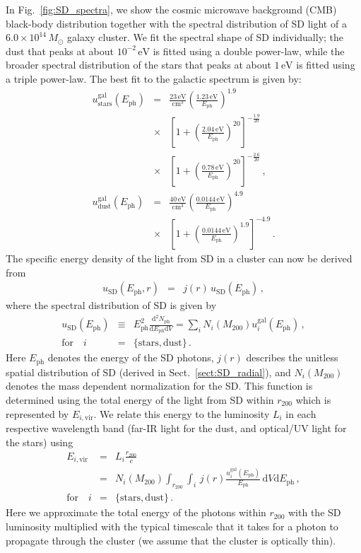 \documentclass[10pt,aps,pra,reprint,amsmath,amsfonts,amssymb,showpacs,nofootinbib,floatfix]{revtex4-1}
\newcommand{\rmn}{\mathrm}
\newcommand{\ph}{\rmn{ph}}
\newcommand{\eph}{E_\ph}
\newcommand{\vir}{\rmn{vir}}
\newcommand{\gal}{\rmn{gal}}
\newcommand{\sd}{\rmn{SD}}
\newcommand{\msun}{M_\odot}
\newcommand{\stars}{\rmn{stars}}
\newcommand{\dust}{\rmn{dust}}
\newcommand{\ev}{\rmn{eV}}
\newcommand{\dd}{\rmn{d}}
\newcommand{\rvir}{r_{200}}
\newcommand{\mvir}{M_{200}}
\begin{document}
In Fig.~\ref{fig:SD_spectra}, we show the cosmic microwave background
(CMB) black-body distribution together with the spectral distribution
of SD light of a $6.0\times10^{14}\,\msun$ galaxy cluster. We fit the
spectral shape of SD individually; the dust that peaks at about
$10^{-2}\,\ev$ is fitted using a double power-law, while the broader
spectral distribution of the stars that peaks at about $1\,\ev$ is
fitted using a triple power-law. The best fit to the galactic spectrum
is given by:
\begin{eqnarray}
  u_\stars^\gal(\eph) &=& \frac{23\,\rmn{eV}}{\rmn{cm}^3}
  \left(\frac{1.23\,\rmn{eV}}{\eph}\right)^{1.9} \nonumber \\
  &\times&\left[1+\left(\frac{2.04\,\rmn{eV}}{\eph}\right)^{20}\right]
  ^{-\frac{1.9}{20}}\nonumber \\
  &\times& \left[1+\left(\frac{0.78\,\rmn{eV}}{\eph}\right)^{20}\right]^{-\frac{2.6}{20}}\,, \\
  u_\dust^\gal(\eph) &=&
  \frac{40\,\rmn{eV}}{\rmn{cm}^3}
  \left(\frac{0.0144\,\rmn{eV}}{\eph}\right)^{4.9}\nonumber \\
  &\times& \left[1+\left(\frac{0.0144\,\rmn{eV}}{\eph}\right)^{1.9}\right]^{-4.9}\,.
\end{eqnarray}
The specific energy density of the light from SD in a cluster can now
be derived from
\begin{eqnarray}
u_\sd(\eph, r) &=& j(r)\,u_\sd(\eph)\,,
\label{eq:u_SD_er}
\end{eqnarray}
where the spectral distribution of SD is given by
\begin{eqnarray}
  u_\sd(\eph) &\equiv& \eph^2\frac{\dd^2 N_\ph}{\dd \eph \dd V}
  = \sum_i N_i(\mvir) u_i^\gal(\eph)\,,\nonumber \\
\rmn{for}\quad i&=&\{\rmn{stars,dust}\}\,.
\end{eqnarray}
Here $\eph$ denotes the energy of the SD photons, $j(r)$ describes the
unitless spatial distribution of SD (derived in
Sect.~\ref{sect:SD_radial}), and $N_i(\mvir)$ denotes the mass
dependent normalization for the SD. This function is determined using
the total energy of the light from SD within $\rvir$ which is
represented by $E_{i,\vir}$. We relate this energy to the luminosity
$L_i$ in each respective wavelength band (far-IR light for the
dust, and optical/UV light for the stars) using
\begin{eqnarray}
  E_{i,\vir} &=& L_i \frac{\rvir}{c} \nonumber \\
  &=&N_i(\mvir)\int_{\rvir} \int_i \,j(r)
  \frac{u_i^\gal(\eph)}{\eph}\,\dd V\dd \eph\,,\nonumber \\
 \rmn{for}\quad i&=&\{\rmn{stars,dust}\}\,.
\label{eq:E_SD}
\end{eqnarray}
Here we approximate the total energy of the photons within $\rvir$
with the SD luminosity multiplied with the typical timescale that it
takes for a photon to propagate through the cluster (we assume that
the cluster is optically thin).
\end{document}
